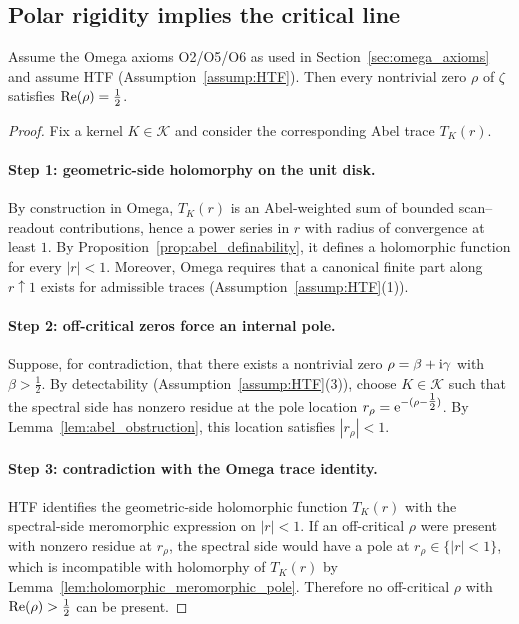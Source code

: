\subsection{Polar rigidity implies the critical line}
\label{sec:polar_rigidity}

\begin{theorem}
\label{thm:polar_rigidity}
Assume the Omega axioms O2/O5/O6 as used in Section~\ref{sec:omega_axioms} and assume HTF (Assumption~\ref{assump:HTF}).
Then every nontrivial zero $\rho$ of $\zeta$ satisfies $\operatorname{Re}(\rho)=\tfrac{1}{2}$.
\end{theorem}

\begin{proof}
Fix a kernel $K\in\mathcal{K}$ and consider the corresponding Abel trace $T_K(r)$.

\paragraph{Step 1: geometric-side holomorphy on the unit disk.}
By construction in Omega, $T_K(r)$ is an Abel-weighted sum of bounded scan--readout contributions, hence a power series in $r$ with radius of convergence at least $1$.
By Proposition~\ref{prop:abel_definability}, it defines a holomorphic function for every $|r|<1$.
Moreover, Omega requires that a canonical finite part along $r\uparrow 1$ exists for admissible traces (Assumption~\ref{assump:HTF}(1)).

\paragraph{Step 2: off-critical zeros force an internal pole.}
Suppose, for contradiction, that there exists a nontrivial zero $\rho=\beta+\mathrm{i}\gamma$ with $\beta>\tfrac{1}{2}$.
By detectability (Assumption~\ref{assump:HTF}(3)), choose $K\in\mathcal{K}$ such that the spectral side has nonzero residue at the pole location $r_\rho=\mathrm{e}^{-(\rho-\tfrac{1}{2})}$.
By Lemma~\ref{lem:abel_obstruction}, this location satisfies $|r_\rho|<1$.

\paragraph{Step 3: contradiction with the Omega trace identity.}
HTF identifies the geometric-side holomorphic function $T_K(r)$ with the spectral-side meromorphic expression on $|r|<1$.
If an off-critical $\rho$ were present with nonzero residue at $r_\rho$, the spectral side would have a pole at $r_\rho\in\{|r|<1\}$, which is incompatible with holomorphy of $T_K(r)$ by Lemma~\ref{lem:holomorphic_meromorphic_pole}.
Therefore no off-critical $\rho$ with $\operatorname{Re}(\rho)>\tfrac{1}{2}$ can be present.


\end{proof}
